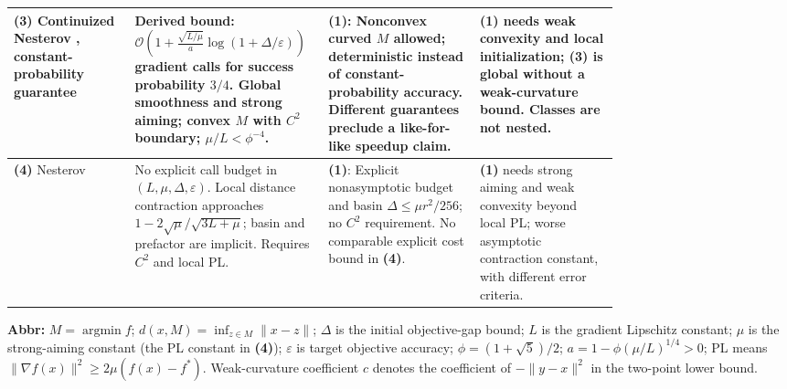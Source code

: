 \begin{table}[tp]
\begin{threeparttable}
\begin{tabularx}{\linewidth}{@{}>{\raggedright\arraybackslash}p{0.20\linewidth}>{\raggedright\arraybackslash}p{0.32\linewidth}>{\raggedright\arraybackslash}p{0.25\linewidth}>{\raggedright\arraybackslash}X@{}}
\midrule
\textbf{(3)} Continuized Nesterov \citep[\S5.2]{lsaHermant2026v2}, constant-probability guarantee & Derived bound: $\mathcal{O}\!\left(1+\frac{\sqrt{L/\mu}}{a}\log(1+\Delta/\varepsilon)\right)$ gradient calls for success probability $3/4$. Global smoothness and strong aiming; convex $M$ with $C^2$ boundary; $\mu/L<\phi^{-4}$. & \textbf{(1)}: Nonconvex curved $M$ allowed; deterministic instead of constant-probability accuracy. Different guarantees preclude a like-for-like speedup claim. & \textbf{(1)} needs weak convexity and local initialization; \textbf{(3)} is global without a weak-curvature bound. Classes are not nested. \\
\midrule
\textbf{(4)} Nesterov \citep[Thm.~2.2]{lsaFeng2026v1} & No explicit call budget in $(L,\mu,\Delta,\varepsilon)$. Local distance contraction approaches $1-2\sqrt{\mu}/\sqrt{3L+\mu}$; basin and prefactor are implicit. Requires $C^2$ and local PL. & \textbf{(1)}: Explicit nonasymptotic budget and basin $\Delta\le\mu r^2/256$; no $C^2$ requirement. No comparable explicit cost bound in \textbf{(4)}. & \textbf{(1)} needs strong aiming and weak convexity beyond local PL; worse asymptotic contraction constant, with different error criteria. \\
\bottomrule
\end{tabularx}
\begin{tablenotes}[flushleft]\footnotesize
\item[] \textbf{Abbr:} $M=\operatorname{argmin}f$; $d(x,M)=\inf_{z\in M}\|x-z\|$; $\Delta$ is the initial objective-gap bound; $L$ is the gradient Lipschitz constant; $\mu$ is the strong-aiming constant (the PL constant in \textbf{(4)}); $\varepsilon$ is target objective accuracy; $\phi=(1+\sqrt5)/2$; $a=1-\phi(\mu/L)^{1/4}>0$; PL means $\|\nabla f(x)\|^2\ge2\mu(f(x)-f^*)$. Weak-curvature coefficient $c$ denotes the coefficient of $-\|y-x\|^2$ in the two-point lower bound.
\end{tablenotes}
\end{threeparttable}
\end{table}
\clearpage
